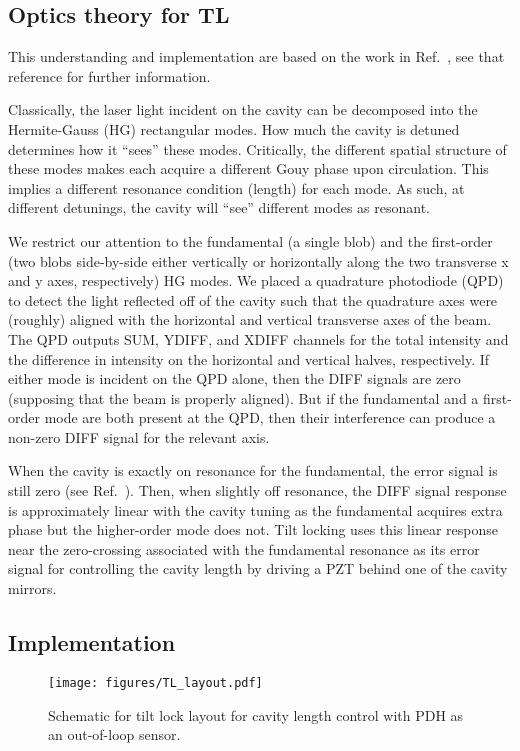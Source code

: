 \documentclass[aps,pra,superscriptaddress,reprint,nofootinbib]{revtex4-1}
\begin{document}
\subsection{Optics theory for TL}

This understanding and implementation are based on the work in Ref.~\cite{TL:1999}, see that reference for further information.


Classically, the laser light incident on the cavity can be decomposed into the Hermite-Gauss (HG) rectangular modes. How much the cavity is detuned determines how it ``sees'' these modes. Critically, the different spatial structure of these modes makes each acquire a different Gouy phase upon circulation. This implies a different resonance condition (length) for each mode. As such, at different detunings, the cavity will ``see'' different modes as resonant.


We restrict our attention to the fundamental (a single blob) and the first-order (two blobs side-by-side either vertically or horizontally along the two transverse x and y axes, respectively) HG modes. We placed a quadrature photodiode (QPD) to detect the light reflected off of the cavity such that the quadrature axes were (roughly) aligned with the horizontal and vertical transverse axes of the beam. The QPD outputs SUM, YDIFF, and XDIFF channels for the total intensity and the difference in intensity on the horizontal and vertical halves, respectively. If either mode is incident on the QPD alone, then the DIFF signals are zero (supposing that the beam is properly aligned). But if the fundamental and a first-order mode are both present at the QPD, then their interference can produce a non-zero DIFF signal for the relevant axis.


When the cavity is exactly on resonance for the fundamental, the error signal is still zero (see Ref.~\cite{TL:1999}). Then, when slightly off resonance, the DIFF signal response is approximately linear with the cavity tuning as the fundamental acquires extra phase but the higher-order mode does not. Tilt locking uses this linear response near the zero-crossing associated with the fundamental resonance as its error signal for controlling the cavity length by driving a PZT behind one of the cavity mirrors.


\subsection{Implementation}

\begin{figure*}
	\texttt{[image: figures/TL\_layout.pdf]}
	\caption{Schematic for tilt lock layout for cavity length control with PDH as an out-of-loop sensor.}
	\label{fig:TL_layout}
\end{figure*}
\end{document}
